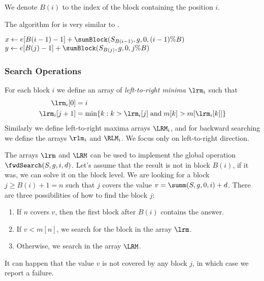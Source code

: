 \bigbreak

We denote $B(i)$ to the index of the block containing the position $i$.

The algorithm for \summ is very similar to \sumBlock.

\begin{algorithm}
\begin{algorithmic}
	\State $x \gets e[B(i - 1) - 1] + \sumBlock(S_{B(i - 1)}, g, 0, (i - 1) \% B)$
	\State $y \gets e[B(j) - 1] + \sumBlock(S_{B(j)}, g, 0, j \% B)$
	\State {}
\EndFunction
\end{algorithmic}
\end{algorithm}

\subsubsection{Search Operations}\label{ff-search}

For each block $i$ we define an array of \emph{left-to-right minima} $\lrm_i$ such that
\begin{align*}
	\lrm_i[0] &= i \\
	\lrm_i[j + 1] &= \min \{k : k > \lrm_i[j] \booland m[k] > m[\lrm_i[k]]\}
\end{align*}
Similarly we define left-to-right maxima arrays $\LRM_i$, and for backward searching we define the arrays $\rlm_i$ and $\RLM_i$.
We focus only on left-to-right direction.

The arrays $\lrm$ and $\LRM$ can be used to implement the global operation $\fwdSearch(S, g, i, d)$.
Let's assume that the result is not in block $B(i)$, if it was, we can solve it on the block level.
We are looking for a block $j \ge B(i) + 1 = n$ such that $j$ covers the value $v = \summ(S, g, 0, i) + d$.
There are three possibilities of how to find the block $j$:
\begin{enumerate}
	\item If $n$ covers $v$, then the first block after $B(i)$ contains the answer.
	\item If $v < m[n]$, we search for the block in the array $\lrm$.
	\item Otherwise, we search in the array $\LRM$.
\end{enumerate}
It can happen that the value $v$ is not covered by any block $j$, in which case we report a failure.


